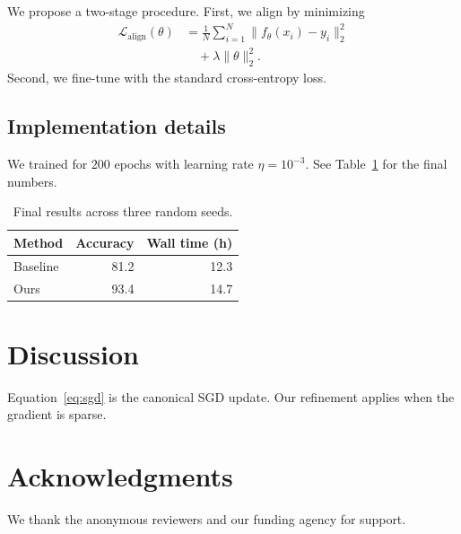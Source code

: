 \documentclass{article}
\begin{document}
We propose a two-stage procedure. First, we align by minimizing
\begin{align}
\mathcal{L}_{\text{align}}(\theta) &= \frac{1}{N} \sum_{i=1}^{N} \| f_\theta(x_i) - y_i \|_2^2 \\
&\quad + \lambda \| \theta \|_2^2.
\end{align}
Second, we fine-tune with the standard cross-entropy loss.

\subsection{Implementation details}

We trained for $200$ epochs with learning rate $\eta = 10^{-3}$. See
Table~\ref{tab:results} for the final numbers.

\begin{table}[h]
  \caption{Final results across three random seeds.}
  \label{tab:results}
  \centering
  \begin{tabular}{lrr}
    \toprule
    Method     & Accuracy & Wall time (h) \\
    \midrule
    Baseline   & 81.2     & 12.3 \\
    Ours       & 93.4     & 14.7 \\
    \bottomrule
  \end{tabular}
\end{table}

\section{Discussion}

Equation~\eqref{eq:sgd} is the canonical SGD update. Our refinement applies
when the gradient is sparse.

\section*{Acknowledgments}

We thank the anonymous reviewers and our funding agency for support.



\end{document}

